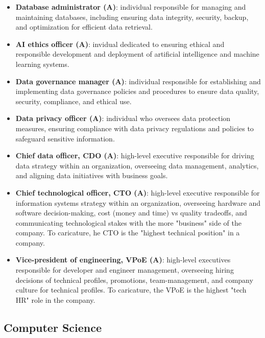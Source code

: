 \documentclass{article}
\begin{document}
\begin{itemize}
	\item \textbf{Database administrator (A)}: individual responsible for managing and maintaining databases, including ensuring data integrity, security, backup, and optimization for efficient data retrieval.

	\item \textbf{AI ethics officer (A)}: invidual dedicated to ensuring ethical and responsible development and deployment of artificial intelligence and machine learning systems.

	\item \textbf{Data governance manager (A)}: individual responsible for establishing and implementing data governance policies and procedures to ensure data quality, security, compliance, and ethical use.

	\item \textbf{Data privacy officer (A)}: individual who oversees data protection measures, ensuring compliance with data privacy regulations and policies to safeguard sensitive information.

	\item \textbf{Chief data officer, CDO (A)}: high-level executive responsible for driving data strategy within an organization, overseeing data management, analytics, and aligning data initiatives with business goals.

	\item \textbf{Chief technological officer, CTO (A)}: high-level executive responsible for information systems strategy within an organization, overseeing hardware and software decision-making, cost (money and time) vs quality tradeoffs, and communicating technological stakes with the more "business" side of the company. To caricature, he CTO is the "highest technical position" in a company.

	\item \textbf{Vice-president of engineering, VPoE (A)}: high-level executives responsible for developer and engineer management, overseeing hiring decisions of technical profiles, promotions, team-management, and company culture for technical profiles. To caricature, the VPoE is the highest "tech HR" role in the company.

\end{itemize}




\subsection*{Computer Science}
\end{document}
